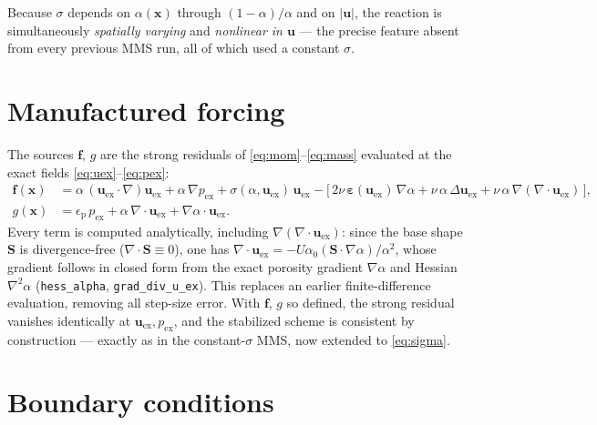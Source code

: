 \documentclass[11pt]{article}
\newcommand{\uu}{\bm{u}}
\newcommand{\xx}{\bm{x}}
\newcommand{\ff}{\bm{f}}
\newcommand{\grad}{\nabla}
\newcommand{\dive}{\grad\!\cdot\!}
\newcommand{\eps}{\bm{\varepsilon}}
\begin{document}
Because $\sigma$ depends on $\alpha(\xx)$ through $(1-\alpha)/\alpha$ and on
$\lvert\uu\rvert$, the reaction is simultaneously \emph{spatially varying} and
\emph{nonlinear in $\uu$} --- the precise feature absent from every previous
MMS run, all of which used a constant $\sigma$.

\section{Manufactured forcing}
\label{sec:forcing}
The sources $\ff$, $g$ are the strong residuals of
\eqref{eq:mom}--\eqref{eq:mass} evaluated at the exact fields
\eqref{eq:uex}--\eqref{eq:pex}:
\begin{align}
\ff(\xx) &=
   \alpha\,(\uu_{\mathrm{ex}}\!\cdot\!\grad)\uu_{\mathrm{ex}}
   + \alpha\,\grad p_{\mathrm{ex}}
   + \sigma(\alpha,\uu_{\mathrm{ex}})\,\uu_{\mathrm{ex}}
   - \Big[\,2\nu\,\eps(\uu_{\mathrm{ex}})\,\grad\alpha
           + \nu\,\alpha\,\Delta\uu_{\mathrm{ex}}
           + \nu\,\alpha\,\grad(\dive\uu_{\mathrm{ex}})\,\Big],
  \label{eq:f}\\[4pt]
g(\xx) &= \epsilon_{\mathrm p}\,p_{\mathrm{ex}}
   + \alpha\,\dive\uu_{\mathrm{ex}}
   + \grad\alpha\!\cdot\!\uu_{\mathrm{ex}} .
  \label{eq:g}
\end{align}
Every term is computed analytically, including
$\grad(\dive\uu_{\mathrm{ex}})$: since the base shape
$\bm S$ is divergence-free ($\dive\bm S\equiv0$), one has
$\dive\uu_{\mathrm{ex}}=-U\alpha_0(\bm S\!\cdot\!\grad\alpha)/\alpha^2$, whose
gradient follows in closed form from the exact porosity gradient $\grad\alpha$
and Hessian $\grad^2\alpha$ (\texttt{hess\_alpha}, \texttt{grad\_div\_u\_ex}).
This replaces an earlier finite-difference evaluation, removing all step-size
error. With $\ff$, $g$ so defined, the strong residual vanishes
identically at $\uu_{\mathrm{ex}},p_{\mathrm{ex}}$, and the stabilized scheme
is consistent by construction --- exactly as in the constant-$\sigma$ MMS, now
extended to \eqref{eq:sigma}.

\section{Boundary conditions}
\end{document}
